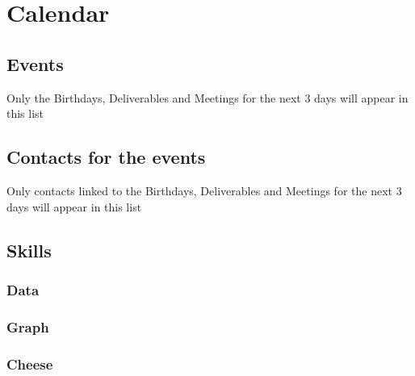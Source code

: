 \documentclass[8pt]{article} %
\begin{document}
%

%

\section{Calendar}

\subsection{Events}
{\footnotesize
Only the Birthdays, Deliverables and Meetings for the next 3 days will appear in this list\\
}
{\footnotesize

}

\subsection{Contacts for the events}
{\footnotesize
Only contacts linked to the Birthdays, Deliverables and Meetings for the next 3 days will appear in this list\\

}

%

\subsection{Skills}

{\footnotesize
\subsubsection{Data}

\subsubsection{Graph}

\subsubsection{Cheese}

}
\end{document}

